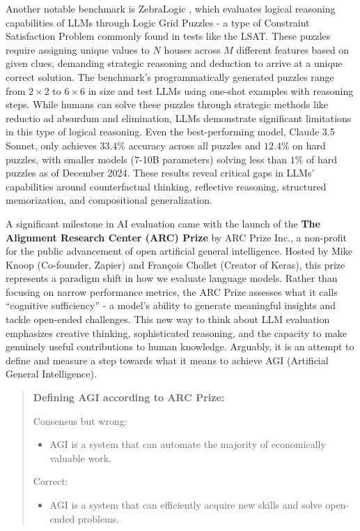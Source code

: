Another notable benchmark is ZebraLogic , which evaluates logical reasoning capabilities of LLMs through Logic Grid Puzzles - a type of Constraint Satisfaction Problem  commonly found in tests like the LSAT. These puzzles require assigning unique values to $N$ houses across $M$ different features based on given clues, demanding strategic reasoning and deduction to arrive at a unique correct solution. The benchmark's programmatically generated puzzles range from $2\times2$ to $6\times6$ in size and test LLMs using one-shot examples with reasoning steps. While humans can solve these puzzles through strategic methods like reductio ad absurdum and elimination, LLMs demonstrate significant limitations in this type of logical reasoning. Even the best-performing model, Claude 3.5 Sonnet, only achieves $33.4\%$ accuracy across all puzzles and $12.4\%$ on hard puzzles, with smaller models (7-10B parameters) solving less than $1\%$ of hard puzzles as of December 2024. These results reveal critical gaps in LLMs' capabilities around counterfactual thinking, reflective reasoning, structured memorization, and compositional generalization.

A significant milestone in AI evaluation came with the launch of the \textbf{The Alignment Research Center (ARC) Prize}  by ARC Prize Inc., a non-profit for the public advancement of open artificial general intelligence. Hosted by Mike Knoop (Co-founder, Zapier) and François Chollet (Creator of Keras), this prize represents a paradigm shift in how we evaluate language models. Rather than focusing on narrow performance metrics, the ARC Prize assesses what it calls ``cognitive sufficiency'' - a model's ability to generate meaningful insights and tackle open-ended challenges. This new way to think about LLM evaluation emphasizes creative thinking, sophisticated reasoning, and the capacity to make genuinely useful contributions to human knowledge. Arguably, it is an attempt to define and measure a step towards what it means to achieve AGI (Artificial General Intelligence).

\begin{quote}
\textbf{Defining AGI according to ARC Prize:}

Consensus but wrong:
\begin{itemize}
    \item AGI is a system that can automate the majority of economically valuable work.
\end{itemize}

Correct:
\begin{itemize}
    \item AGI is a system that can efficiently acquire new skills and solve open-ended problems.
\end{itemize}
\end{quote}

